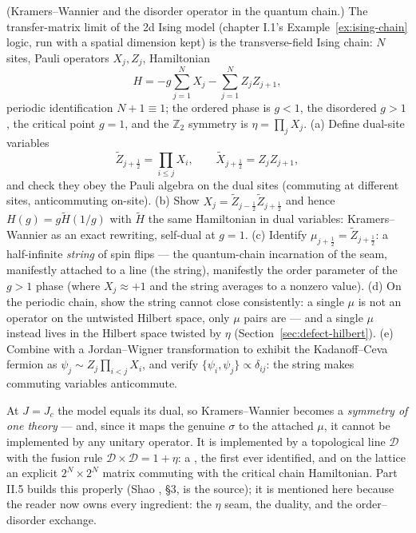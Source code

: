 \begin{exercise}[medium]
\label{exr:quantum-kw}
(Kramers--Wannier and the disorder operator in the quantum chain.) The
transfer-matrix limit of the 2d Ising model (chapter I.1's
Example~\ref{ex:ising-chain} logic, run with a spatial dimension kept)
is the transverse-field Ising chain: $N$ sites, Pauli operators $X_j,
Z_j$, Hamiltonian
\begin{equation*}
H = -g\sum_{j=1}^{N} X_j - \sum_{j=1}^{N} Z_j Z_{j+1},
\end{equation*}
periodic identification $N + 1 \equiv 1$; the ordered phase is $g < 1$,
the disordered $g > 1$, the critical point $g = 1$, and the $\mathbb{Z}_2$
symmetry is $\eta = \prod_j X_j$. (a) Define dual-site variables
\begin{equation*}
\tilde Z_{j+\frac12} = \prod_{i \le j} X_i ,
\qquad
\tilde X_{j+\frac12} = Z_j Z_{j+1},
\end{equation*}
and check they obey the Pauli algebra on the dual sites (commuting at
different sites, anticommuting on-site). (b) Show $X_j = \tilde
Z_{j-\frac12}\tilde Z_{j+\frac12}$ and hence $H(g) = g \tilde H(1/g)$
with $\tilde H$ the same Hamiltonian in dual variables: Kramers--Wannier
as an exact rewriting, self-dual at $g = 1$. (c) Identify $\mu_{j+\frac12}
= \tilde Z_{j+\frac12}$: a half-infinite \emph{string} of spin flips ---
the quantum-chain incarnation of the seam, manifestly attached to a line
(the string), manifestly the order parameter of the $g > 1$ phase (where
$X_j \approx +1$ and the string averages to a nonzero value). (d) On the
periodic chain, show the string cannot close consistently: a single
$\mu$ is not an operator on the untwisted Hilbert space, only $\mu$
pairs are --- and a single $\mu$ instead lives in the Hilbert space
twisted by $\eta$ (Section~\ref{sec:defect-hilbert}). (e) Combine with a
Jordan--Wigner transformation to exhibit the Kadanoff--Ceva fermion as
$\psi_j \sim Z_j \prod_{i<j} X_i$, and verify
$\{\psi_i, \psi_j\} \propto \delta_{ij}$: the string makes commuting
variables anticommute.
\end{exercise}

\begin{ppreview}
At $J = J_c$ the model equals its dual, so Kramers--Wannier becomes a
\emph{symmetry of one theory} --- and, since it maps the genuine
$\sigma$ to the attached $\mu$, it cannot be implemented by any unitary
operator. It is implemented by a topological line $\mathcal D$ with the
fusion rule $\mathcal D \times \mathcal D = 1 + \eta$: a
, the first ever identified, and on the
lattice an explicit $2^N \times 2^N$ matrix commuting with the critical
chain Hamiltonian. Part II.5 builds this properly (Shao
, \S3, is the source); it is mentioned here because
the reader now owns every ingredient: the $\eta$ seam, the duality, and
the order--disorder exchange.
\end{ppreview}

